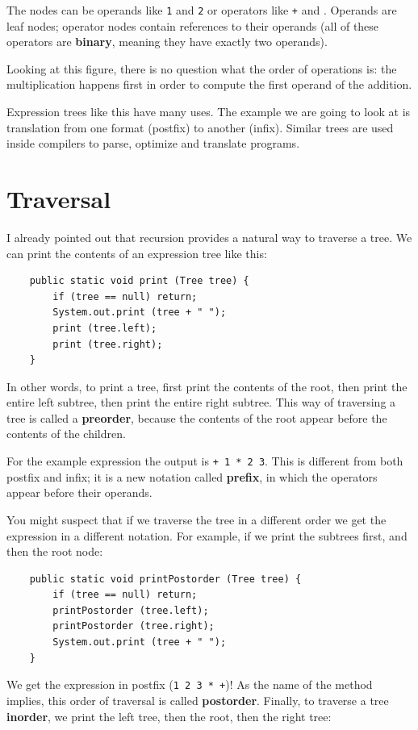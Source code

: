 \documentclass[12pt]{book}
\theoremstyle{exercise}
\begin{document}
The nodes can be operands like {\tt 1} and {\tt 2} or operators
like {\tt +} and {\tt *}.  Operands are leaf nodes; operator nodes 
contain references to their operands (all of these operators
are {\bf binary}, meaning they have exactly two operands).

Looking at this figure, there is no question what the order of
operations is: the multiplication happens first in order to compute
the first operand of the addition.

Expression trees like this have many uses.  The example we are
going to look at is translation from one format (postfix) to
another (infix).  Similar trees are used inside compilers to parse,
optimize and translate programs.


\section {Traversal}

I already pointed out that recursion provides a natural way to
traverse a tree.  We can print the contents of an expression tree
like this:

\begin{verbatim}
    public static void print (Tree tree) {
        if (tree == null) return;
        System.out.print (tree + " ");
        print (tree.left);
        print (tree.right);
    }
\end{verbatim}
%
In other words, to print a tree, first print the contents of
the root, then print the entire left subtree, then print the
entire right subtree.  This way of traversing a tree is called
a {\bf preorder}, because the contents of the root appear before
the contents of the children.

For the example expression the output is {\tt + 1 * 2 3}.  This
is different from both postfix and infix; it is a new notation called
{\bf prefix}, in which the operators appear before their operands.

You might suspect that if we traverse the tree in a
different order we get the expression in a different
notation.  For example, if we print the subtrees first, and then
the root node:

\begin{verbatim}
    public static void printPostorder (Tree tree) {
        if (tree == null) return;
        printPostorder (tree.left);
        printPostorder (tree.right);
        System.out.print (tree + " ");
    }
\end{verbatim}
%
We get the expression in postfix ({\tt 1 2 3 * +})!  As the
name of the method implies, this order of traversal
is called {\bf postorder}.  Finally, to traverse a tree {\bf inorder},
we print the left tree, then the root, then the right tree:
\end{document}
